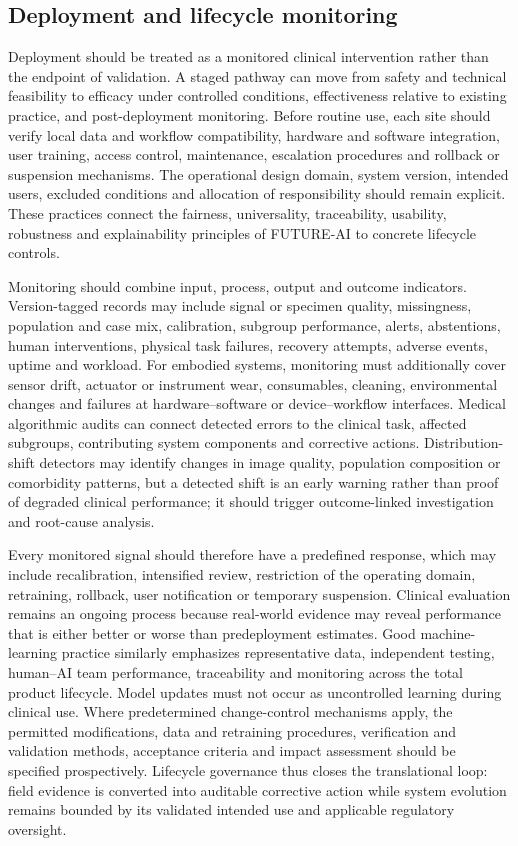 \documentclass[12pt,a4paper]{article}
\begin{document}
\subsection{Deployment and lifecycle monitoring}
\label{subsec:deployment_lifecycle_monitoring}
Deployment should be treated as a monitored clinical intervention rather than the endpoint of validation. A staged pathway can move from safety and technical feasibility to efficacy under controlled conditions, effectiveness relative to existing practice, and post-deployment monitoring. Before routine use, each site should verify local data and workflow compatibility, hardware and software integration, user training, access control, maintenance, escalation procedures and rollback or suspension mechanisms. The operational design domain, system version, intended users, excluded conditions and allocation of responsibility should remain explicit. These practices connect the fairness, universality, traceability, usability, robustness and explainability principles of FUTURE-AI to concrete lifecycle controls.

Monitoring should combine input, process, output and outcome indicators. Version-tagged records may include signal or specimen quality, missingness, population and case mix, calibration, subgroup performance, alerts, abstentions, human interventions, physical task failures, recovery attempts, adverse events, uptime and workload. For embodied systems, monitoring must additionally cover sensor drift, actuator or instrument wear, consumables, cleaning, environmental changes and failures at hardware--software or device--workflow interfaces. Medical algorithmic audits can connect detected errors to the clinical task, affected subgroups, contributing system components and corrective actions. Distribution-shift detectors may identify changes in image quality, population composition or comorbidity patterns, but a detected shift is an early warning rather than proof of degraded clinical performance; it should trigger outcome-linked investigation and root-cause analysis.

Every monitored signal should therefore have a predefined response, which may include recalibration, intensified review, restriction of the operating domain, retraining, rollback, user notification or temporary suspension. Clinical evaluation remains an ongoing process because real-world evidence may reveal performance that is either better or worse than predeployment estimates. Good machine-learning practice similarly emphasizes representative data, independent testing, human--AI team performance, traceability and monitoring across the total product lifecycle. Model updates must not occur as uncontrolled learning during clinical use. Where predetermined change-control mechanisms apply, the permitted modifications, data and retraining procedures, verification and validation methods, acceptance criteria and impact assessment should be specified prospectively. Lifecycle governance thus closes the translational loop: field evidence is converted into auditable corrective action while system evolution remains bounded by its validated intended use and applicable regulatory oversight.
\end{document}
